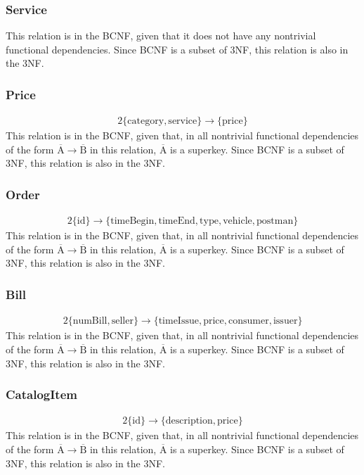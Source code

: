 \documentclass{report}[a4paper]
\theoremstyle{remark}
\begin{document}
\subsubsection{Service}
This relation is in the BCNF, given that it does not have any nontrivial functional dependencies. Since BCNF is a subset of 3NF, this relation is also in the 3NF.
\subsubsection{Price}
\begin{alignat*}{2}
\{\text{category},\text{service}\} \rightarrow \{\text{price}\}
\end{alignat*}
This relation is in the BCNF, given that, in all nontrivial functional dependencies of the form $\overline{\text{A}} \rightarrow \overline{\text{B}}$ in this relation, $\overline{\text{A}}$ is a superkey. Since BCNF is a subset of 3NF, this relation is also in the 3NF.
\subsubsection{Order}
\begin{alignat*}{2}
\{\text{id}\} \rightarrow \{\text{timeBegin},\text{timeEnd},\text{type},\text{vehicle},\text{postman}\}
\end{alignat*}
This relation is in the BCNF, given that, in all nontrivial functional dependencies of the form $\overline{\text{A}} \rightarrow \overline{\text{B}}$ in this relation, $\overline{\text{A}}$ is a superkey. Since BCNF is a subset of 3NF, this relation is also in the 3NF.
\subsubsection{Bill}
\begin{alignat*}{2}
\{\text{numBill},\text{seller}\} \rightarrow \{\text{timeIssue},\text{price},\text{consumer},\text{issuer}\}
\end{alignat*}
This relation is in the BCNF, given that, in all nontrivial functional dependencies of the form $\overline{\text{A}} \rightarrow \overline{\text{B}}$ in this relation, $\overline{\text{A}}$ is a superkey. Since BCNF is a subset of 3NF, this relation is also in the 3NF.
\subsubsection{CatalogItem}
\begin{alignat*}{2}
\{\text{id}\} \rightarrow \{\text{description},\text{price}\}
\end{alignat*}
This relation is in the BCNF, given that, in all nontrivial functional dependencies of the form $\overline{\text{A}} \rightarrow \overline{\text{B}}$ in this relation, $\overline{\text{A}}$ is a superkey. Since BCNF is a subset of 3NF, this relation is also in the 3NF.
\end{document}
